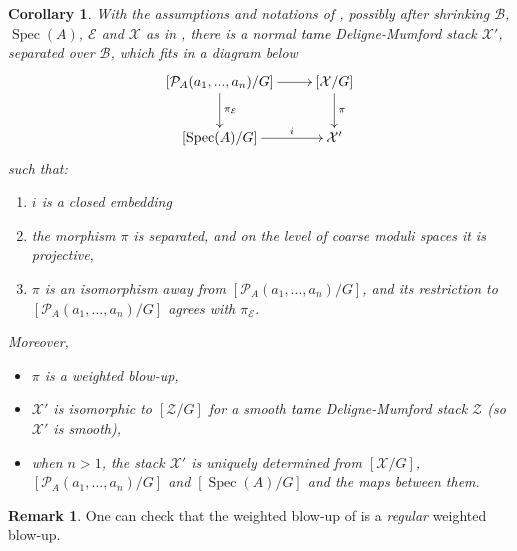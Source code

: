 \documentclass{amsart}
\newcommand{\cB}{\mathcal{B}}
\newcommand{\cE}{\mathcal{E}}
\newcommand{\cP}{\mathcal{P}}
\newcommand{\cX}{\mathcal{X}}
\newcommand{\cZ}{\mathcal{Z}}
\newcommand{\spec}{\operatorname{Spec}}
\newtheorem{Cor}[theorem]{Corollary}
\theoremstyle{definition}
\newtheorem{Remark}[theorem]{Remark}
\begin{document}
\begin{Cor}\label{cor_blowdown_Y_is_specA_divided_by_G}
    With the assumptions and notations of , possibly after shrinking $\cB$, $\spec(A)$, $\cE$ and $\cX$ as in , there is a normal \textcolor{black}{tame} Deligne-Mumford stack $\cX'$, separated over $\cB$, which fits in a diagram below
    $$\xymatrix{[\cP_A(a_1,...,a_n)/G]\ar[d]^{\pi_\cE} \ar[r] & [\cX/G]\ar[d]^\pi \\ [\spec(A)/G] \ar[r]^-i & \cX'}$$
    such that:
    \begin{enumerate}
    \item $i$ is a closed embedding
        \item the morphism $\pi$ is separated, and on the level of coarse moduli spaces it is projective,
        \item $\pi$ is an isomorphism away from $[\cP_A(a_1,...,a_n)/G]$, and its restriction to $[\cP_A(a_1,...,a_n)/G]$ agrees with $\pi_\cE$.
    \end{enumerate}
    Moreover,\begin{itemize}
        \item $\pi$ is a weighted blow-up, 
        \item $\cX'$ is isomorphic to $[\cZ/G]$ for a smooth \textcolor{black}{tame} Deligne-Mumford stack $\cZ$ (so $\cX'$ is smooth),
        
        \item  when $n>1$, the stack $\cX'$ is uniquely determined from $[\cX/G]$, $[\cP_A(a_1,...,a_n)/G]$ and $[\spec(A)/G]$ and the maps between them.
    \end{itemize} 
\end{Cor}
\begin{Remark}
    One can check that the weighted blow-up of  is a \textit{regular} weighted blow-up.
\end{Remark}
\end{document}
